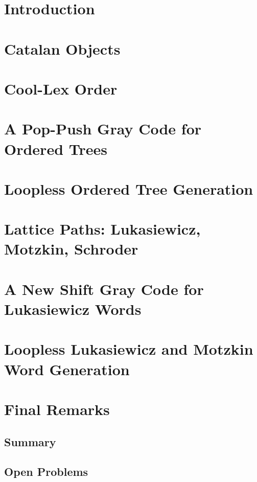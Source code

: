 


\maketitle
\tableofcontents

\chapter{Introduction}

\chapter{Catalan Objects} \label{chap:catalan}

\chapter{Cool-Lex Order}


\chapter{A Pop-Push Gray Code for Ordered Trees} \label{chap:otree-graycode}

\chapter{Loopless Ordered Tree Generation} \label{chap:otree-implementation}



\chapter{Lattice Paths: Lukasiewicz, Motzkin, Schroder}


\chapter{A New Shift Gray Code for Lukasiewicz Words} \label{chap:luka-graycode}

\chapter{Loopless Lukasiewicz and Motzkin Word Generation} \label{chap:luka-implementation}


\chapter{Final Remarks}
\section{Summary}
\section{Open Problems}





